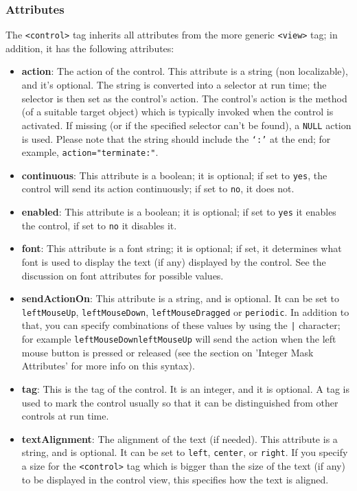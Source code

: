 \subsubsection{Attributes}
The \texttt{<control>} tag inherits all attributes from the more
generic \texttt{<view>} tag; in addition, it has the following
attributes:
\begin{itemize}
\item {\bf action}: The action of the control.  This attribute is a
  string (non localizable), and it's optional.  The string is
  converted into a selector at run time; the selector is then set as
  the control's action.  The control's action is the method (of a
  suitable target object) which is typically invoked when the control
  is activated.  If missing (or if the specified selector can't be
  found), a \texttt{NULL} action is used.  Please note that the string
  should include the \texttt{`:'} at the end; for example,
  \texttt{action="terminate:"}.
\item {\bf continuous}: This attribute is a boolean; it is optional;
  if set to \texttt{yes}, the control will send its action
  continuously; if set to \texttt{no}, it does not.
\item {\bf enabled}: This attribute is a boolean; it is optional; if
  set to \texttt{yes} it enables the control, if set to \texttt{no} it
  disables it.
\item {\bf font}: This attribute is a font string; it is optional; if
  set, it determines what font is used to display the text (if any)
  displayed by the control.  See the discussion on font attributes for
  possible values.
\item {\bf sendActionOn}: This attribute is a string, and is optional.
  It can be set to \texttt{leftMouseUp}, \texttt{leftMouseDown},
  \texttt{leftMouseDragged} or \texttt{periodic}.  In addition to
  that, you can specify combinations of these values by using the
  \texttt{|} character; for example \texttt{leftMouseDown\discretionary{|}{}{|}leftMouseUp}
  will send the action when the left mouse button is pressed or
  released (see the section on 'Integer Mask Attributes' for more info
  on this syntax).
\item {\bf tag}: This is the tag of the control.  It is an integer,
  and it is optional.  A tag is used to mark the control usually so
  that it can be distinguished from other controls at run time.
\item {\bf textAlignment}: The alignment of the text (if needed).
  This attribute is a string, and is optional.  It can be set to
  \texttt{left}, \texttt{center}, or \texttt{right}.  If you specify a
  size for the \texttt{<control>} tag which is bigger than the size of
  the text (if any) to be displayed in the control view, this
  specifies how the text is aligned.
\end{itemize}

